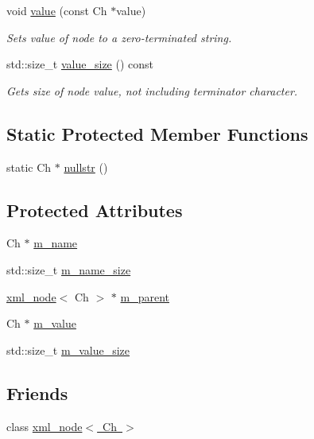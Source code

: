 \begin{DoxyCompactItemize}
void \mbox{\hyperlink{classrapidxml_1_1xml__base_a18c7469acdca771de9b4f3054053029c}{value}} (const Ch $\ast$value)
\begin{DoxyCompactList}\small\item\em Sets value of node to a zero-\/terminated string. \end{DoxyCompactList}\item 
std\+::size\+\_\+t \mbox{\hyperlink{classrapidxml_1_1xml__base_aa6981b3244607ea4ae7634f74f25361b}{value\+\_\+size}} () const
\begin{DoxyCompactList}\small\item\em Gets size of node value, not including terminator character. \end{DoxyCompactList}\end{DoxyCompactItemize}
\subsection*{Static Protected Member Functions}
\begin{DoxyCompactItemize}
\item 
static Ch $\ast$ \mbox{\hyperlink{classrapidxml_1_1xml__base_a641d0b8df8e0c3c7e0db06ced0e0749f}{nullstr}} ()
\end{DoxyCompactItemize}
\subsection*{Protected Attributes}
\begin{DoxyCompactItemize}
\item 
Ch $\ast$ \mbox{\hyperlink{classrapidxml_1_1xml__base_a23053aafada985ece680d52694c63cdc}{m\+\_\+name}}
\item 
std\+::size\+\_\+t \mbox{\hyperlink{classrapidxml_1_1xml__base_af67d7df13abd2eb30036a801b87d6f81}{m\+\_\+name\+\_\+size}}
\item 
\mbox{\hyperlink{classrapidxml_1_1xml__node}{xml\+\_\+node}}$<$ Ch $>$ $\ast$ \mbox{\hyperlink{classrapidxml_1_1xml__base_a1b2fdbb90cc0cc9135a8311c40d79bf9}{m\+\_\+parent}}
\item 
Ch $\ast$ \mbox{\hyperlink{classrapidxml_1_1xml__base_a8fbc9ba6b320f64f4bdab09469a9e623}{m\+\_\+value}}
\item 
std\+::size\+\_\+t \mbox{\hyperlink{classrapidxml_1_1xml__base_a643295fc68623ed58e2db3551d44fef0}{m\+\_\+value\+\_\+size}}
\end{DoxyCompactItemize}
\subsection*{Friends}
\begin{DoxyCompactItemize}
\item 
class \mbox{\hyperlink{classrapidxml_1_1xml__attribute_aa7e464ce3fe512598ff8dda47291941f}{xml\+\_\+node$<$ Ch $>$}}
\end{DoxyCompactItemize}


